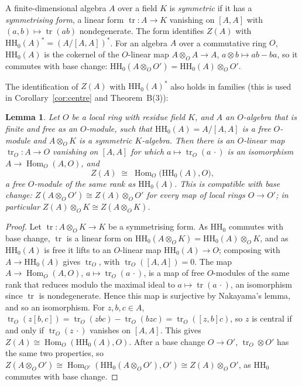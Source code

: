 \documentclass[11pt]{amsart}
\makeatletter
\numberwithin{table}{section}
\numberwithin{figure}{section}
\numberwithin{equation}{section}
\newtheorem{lem}[thm]{Lemma}
\theoremstyle{definition}
\theoremstyle{plain}
\newcommand{\HH}{\mathrm{HH}}
\DeclareMathOperator{\Hom}{Hom}
\renewcommand\paragraph{\@startsection{paragraph}{4}{\z@}{\medskipamount}{-.5em}{\normalfont\bfseries}}
\makeatother
\begin{document}
\paragraph{Symmetric algebras.} A finite-dimensional algebra $A$ over a field $K$ is \emph{symmetric} if it has a \emph{symmetrising form}, a linear form $\operatorname{tr}\colon A \to K$ vanishing on $[A, A]$ with $(a, b) \mapsto \operatorname{tr}(ab)$ nondegenerate. The form identifies $Z(A)$ with $\HH_0(A)^* = (A/[A, A])^*$. For an algebra $A$ over a commutative ring $O$, $\HH_0(A)$ is the cokernel of the $O$-linear map $A \otimes_O A \to A$, $a \otimes b \mapsto ab - ba$, so it commutes with base change: $\HH_0(A \otimes_O O') = \HH_0(A) \otimes_O O'$.

The identification of $Z(A)$ with $\HH_0(A)^*$ also holds in families (this is used in Corollary~\ref{cor:centre} and Theorem~B(3)):

\begin{lem}\label{lem:symfamily}
Let $O$ be a local ring with residue field $K$, and $A$ an $O$-algebra that is finite and free as an $O$-module, such that $\HH_0(A) = A/[A, A]$ is a free $O$-module and $A \otimes_O K$ is a symmetric $K$-algebra. Then there is an $O$-linear map $\operatorname{tr}_O\colon A \to O$ vanishing on $[A, A]$ for which $a \mapsto \operatorname{tr}_O(a\,\cdot)$ is an isomorphism $A \to \Hom_O(A, O)$, and
\[
Z(A) \;\cong\; \Hom_O\big(\HH_0(A), O\big),
\]
a free $O$-module of the same rank as $\HH_0(A)$. This is compatible with base change: $Z(A \otimes_O O') \cong Z(A) \otimes_O O'$ for every map of local rings $O \to O'$; in particular $Z(A) \otimes_O K \cong Z(A \otimes_O K)$.
\end{lem}

\begin{proof}
Let $\operatorname{tr}\colon A \otimes_O K \to K$ be a symmetrising form. As $\HH_0$ commutes with base change, $\operatorname{tr}$ is a linear form on $\HH_0(A \otimes_O K) = \HH_0(A) \otimes_O K$, and as $\HH_0(A)$ is free it lifts to an $O$-linear map $\HH_0(A) \to O$; composing with $A \to \HH_0(A)$ gives $\operatorname{tr}_O$, with $\operatorname{tr}_O([A, A]) = 0$. The map $A \to \Hom_O(A, O)$, $a \mapsto \operatorname{tr}_O(a\,\cdot)$, is a map of free $O$-modules of the same rank that reduces modulo the maximal ideal to $a \mapsto \operatorname{tr}(a\,\cdot)$, an isomorphism since $\operatorname{tr}$ is nondegenerate. Hence this map is surjective by Nakayama's lemma, and so an isomorphism. For $z, b, c \in A$, $\operatorname{tr}_O(z[b, c]) = \operatorname{tr}_O(zbc) - \operatorname{tr}_O(bzc) = \operatorname{tr}_O([z, b]c)$, so $z$ is central if and only if $\operatorname{tr}_O(z\,\cdot)$ vanishes on $[A, A]$. This gives $Z(A) \cong \Hom_O(\HH_0(A), O)$. After a base change $O \to O'$, $\operatorname{tr}_O \otimes O'$ has the same two properties, so $Z(A \otimes_O O') \cong \Hom_{O'}(\HH_0(A \otimes_O O'), O') \cong Z(A) \otimes_O O'$, as $\HH_0$ commutes with base change.
\end{proof}
\end{document}
